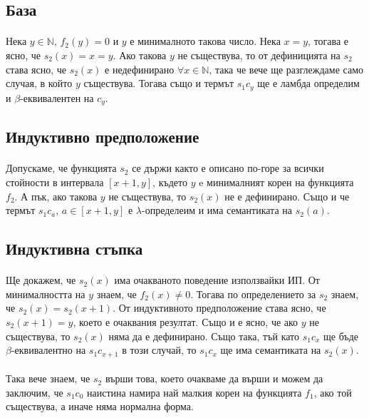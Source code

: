 \documentclass[12pt]{article}
\begin{document}
\subsection*{База}
\paragraph*{}
Нека $y \in \mathbb{N}$, $f_2(y) = 0$ и $y$ е минималното такова число. Нека $x = y$, тогава е ясно, че $s_2(x) = x = y$. Ако такова $y$ не съществува, то от дефиницията на $s_2$ става ясно, че $s_2(x)$ е недефинирано $\forall x \in \mathbb{N}$, така че вече ще разглеждаме само случая, в който $y$ съществува. Тогава също и термът $s_1 c_y$ ще е ламбда определим и $\beta$-еквивалентен на $c_y$.

\subsection*{Индуктивно предположение}
\paragraph*{}
Допускаме, че функцията $s_2$ се държи както е описано по-горе за всички стойности в интервала $[x+1, y]$, където $y$ e минималният корен на функцията $f_2$. А пък, ако такова $y$ не съществува, то $s_2(x)$ не е дефинирано. Също и че термът $s_1 c_a$, $a \in [x+1, y]$ е $\lambda$-определеим и има семантиката на $s_2(a)$.     

\subsection*{Индуктивна стъпка}
\paragraph*{}
Ще докажем, че $s_2(x)$ има очакваното поведение използвайки ИП. От минималността на $y$ знаем, че $f_2(x) \neq 0$. Тогава по определението за $s_2$ знаем, че $s_2(x) = s_2(x+1)$. От индуктивното предположение става ясно, че $s_2(x+1) = y$, което е очаквания резултат. Също и е ясно, че ако $y$ не съществува, то $s_2(x)$ няма да е дефинирано. Също така, тъй като $s_1 c_x$ ще бъде $\beta$-еквивалентно на $s_1 c_{x+1}$ в този случай, то $s_1 c_x$ ще има семантиката на $s_2(x)$.

\paragraph*{}
Така вече знаем, че $s_2$ върши това, което очакваме да върши и можем да заключим, че $s_1 c_0$ наистина намира най малкия корен на функцията $f_1$, ако той съществува, а иначе няма нормална форма. 
\end{document}
